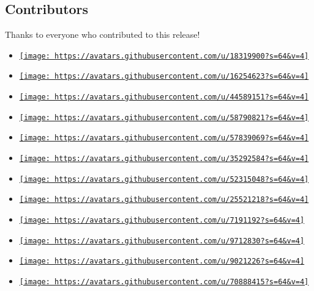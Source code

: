 \subsection{Contributors}\label{contributors}

Thanks to everyone who contributed to this release!

\begin{itemize}
\tightlist
\item
  \href{https://github.com/Leedehai}{\texttt{[image: https://avatars.githubusercontent.com/u/18319900?s=64\&v=4]}}
\item
  \href{https://github.com/elegaanz}{\texttt{[image: https://avatars.githubusercontent.com/u/16254623?s=64\&v=4]}}
\item
  \href{https://github.com/frozolotl}{\texttt{[image: https://avatars.githubusercontent.com/u/44589151?s=64\&v=4]}}
\item
  \href{https://github.com/A-Walrus}{\texttt{[image: https://avatars.githubusercontent.com/u/58790821?s=64\&v=4]}}
\item
  \href{https://github.com/MDLC01}{\texttt{[image: https://avatars.githubusercontent.com/u/57839069?s=64\&v=4]}}
\item
  \href{https://github.com/Myriad-Dreamin}{\texttt{[image: https://avatars.githubusercontent.com/u/35292584?s=64\&v=4]}}
\item
  \href{https://github.com/3w36zj6}{\texttt{[image: https://avatars.githubusercontent.com/u/52315048?s=64\&v=4]}}
\item
  \href{https://github.com/Enter-tainer}{\texttt{[image: https://avatars.githubusercontent.com/u/25521218?s=64\&v=4]}}
\item
  \href{https://github.com/EpicEricEE}{\texttt{[image: https://avatars.githubusercontent.com/u/7191192?s=64\&v=4]}}
\item
  \href{https://github.com/Jocs}{\texttt{[image: https://avatars.githubusercontent.com/u/9712830?s=64\&v=4]}}
\item
  \href{https://github.com/PgBiel}{\texttt{[image: https://avatars.githubusercontent.com/u/9021226?s=64\&v=4]}}
\item
  \href{https://github.com/QuarticCat}{\texttt{[image: https://avatars.githubusercontent.com/u/70888415?s=64\&v=4]}}

\end{itemize}
